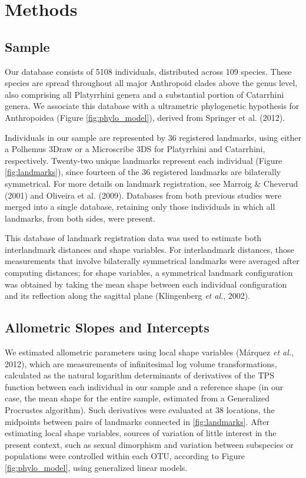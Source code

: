 \documentclass[12pt,twoside]{report}
\begin{document}
\section{Methods}\label{methods-1}

\subsection{Sample}\label{sample-1}

Our database consists of 5108 individuals, distributed across 109
species. These species are spread throughout all major Anthropoid clades
above the genus level, also comprising all Platyrrhini genera and a
substantial portion of Catarrhini genera. We associate this database
with a ultrametric phylogenetic hypothesis for Anthropoidea (Figure
\ref{fig:phylo_model}), derived from Springer et al. (2012).

Individuals in our sample are represented by 36 registered landmarks,
using either a Polhemus 3Draw or a Microscribe 3DS for Platyrrhini and
Catarrhini, respectively. Twenty-two unique landmarks represent each
individual (Figure \ref{fig:landmarks}), since fourteen of the 36
registered landmarks are bilaterally symmetrical. For more details on
landmark registration, see Marroig \& Cheverud (2001) and Oliveira et
al. (2009). Databases from both previous studies were merged into a
single database, retaining only those individuals in which all
landmarks, from both sides, were present.

This database of landmark registration data was used to estimate both
interlandmark distances and shape variables. For interlandmark
distances, those measurements that involve bilaterally symmetrical
landmarks were averaged after computing distances; for shape variables,
a symmetrical landmark configuration was obtained by taking the mean
shape between each individual configuration and its reflection along the
sagittal plane (Klingenberg \emph{et al.}, 2002).

\subsection{Allometric Slopes and
Intercepts}\label{allometric-slopes-and-intercepts}

We estimated allometric parameters using local shape variables (Márquez
\emph{et al.}, 2012), which are measurements of infinitesimal log volume
transformations, calculated as the natural logarithm determinants of
derivatives of the TPS function between each individual in our sample
and a reference shape (in our case, the mean shape for the entire
sample, estimated from a Generalized Procrustes algorithm). Such
derivatives were evaluated at 38 locations, the midpoints between pairs
of landmarks connected in \autoref{fig:landmarks}. After estimating
local shape variables, sources of variation of little interest in the
present context, such as sexual dimorphism and variation between
subspecies or populations were controlled within each OTU, according to
Figure \ref{fig:phylo_model}, using generalized linear models.
\end{document}
